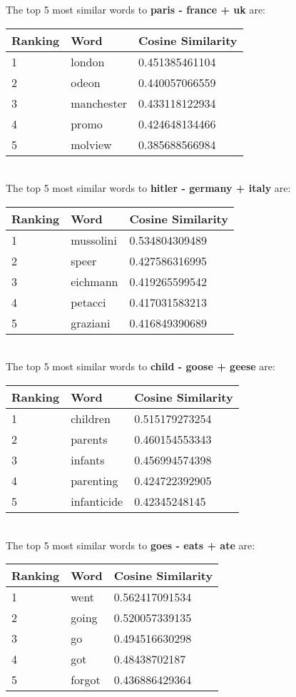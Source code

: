 \documentclass{article}
\begin{document}
The top 5 most similar words to \textbf{paris - france + uk} are:\\
\begin{tabular}{ p{2.5cm}|p{2.5cm}|p{3cm}  }
 \hline
 Ranking & Word & Cosine Similarity\\
 \hline
1 & london & 0.451385461104\\
2 & odeon & 0.440057066559\\
3 & manchester & 0.433118122934\\
4 & promo & 0.424648134466\\
5 & molview & 0.385688566984\\
 \hline
\end{tabular}\\

The top 5 most similar words to \textbf{hitler - germany + italy} are:\\
\begin{tabular}{ p{2.5cm}|p{2.5cm}|p{3cm}  }
 \hline
 Ranking & Word & Cosine Similarity\\
 \hline
1 & mussolini & 0.534804309489\\
2 & speer & 0.427586316995\\
3 & eichmann & 0.419265599542\\
4 & petacci & 0.417031583213\\
5 & graziani & 0.416849390689\\
 \hline
\end{tabular}\\

The top 5 most similar words to \textbf{child - goose + geese} are:\\
\begin{tabular}{ p{2.5cm}|p{2.5cm}|p{3cm}  }
 \hline
 Ranking & Word & Cosine Similarity\\
 \hline
1 & children & 0.515179273254\\
2 & parents & 0.460154553343\\
3 & infants & 0.456994574398\\
4 & parenting & 0.424722392905\\
5 & infanticide & 0.42345248145\\
 \hline
\end{tabular}\\

The top 5 most similar words to \textbf{goes - eats + ate} are:\\
\begin{tabular}{ p{2.5cm}|p{2.5cm}|p{3cm}  }
 \hline
 Ranking & Word & Cosine Similarity\\
 \hline
1 & went & 0.562417091534\\
2 & going & 0.520057339135\\
3 & go & 0.494516630298\\
4 & got & 0.48438702187\\
5 & forgot & 0.436886429364\\
 \hline
\end{tabular}\\
\end{document}
